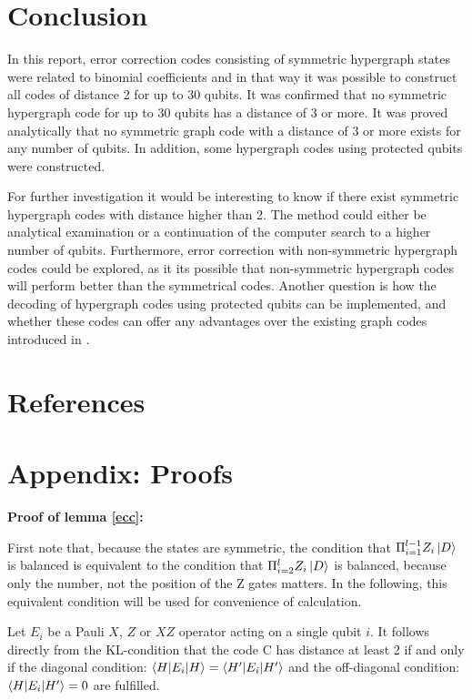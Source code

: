 \documentclass[12pt]{iopart}
\begin{document}
\section{Conclusion}

In this report, error correction codes consisting of symmetric hypergraph states were related to binomial coefficients and in that way it was possible to construct all codes of distance 2 for up to 30 qubits. It was confirmed that no symmetric hypergraph code for up to 30 qubits has a distance of 3 or more.
It was proved analytically that no symmetric graph code with a distance of 3 or more exists for any number of qubits.
In addition, some hypergraph codes using protected qubits were constructed.

For further investigation it would be interesting to know if there exist symmetric hypergraph codes with distance higher than 2. The method could either be analytical examination or a continuation of the computer search to a higher number of qubits.
Furthermore, error correction with non-symmetric hypergraph codes could be explored, as it its possible that non-symmetric hypergraph codes will perform better than the symmetrical codes.
Another question is how the decoding of hypergraph codes using protected qubits can be implemented, and whether these codes can offer any advantages over the existing graph codes introduced in \cite{EAQECC}.

\section*{References}

{}


\section*{Appendix: Proofs}

\textbf{Proof of lemma \ref{ecc}:}

First note that, because the states are symmetric, the condition that $\Pi_{i=1}^{l-1}Z_i\ket{D}$ is balanced is equivalent to the condition that $\Pi_{i=2}^{l}Z_i\ket{D}$ is balanced, because only the number, not the position of the Z gates matters. In the following, this equivalent condition will be used for convenience of calculation.

Let $E_i$ be a Pauli $X$, $Z$ or $XZ$ operator acting on a single qubit $i$.
It follows directly from the KL-condition that the code C has
distance at least 2 if and only if the diagonal condition:
$\braket{H|E_i|H} = \braket{H^\prime|E_i|H^\prime}$
and the off-diagonal condition:
$\braket{H|E_i|H^\prime} = 0$
are fulfilled.
\\
\end{document}
